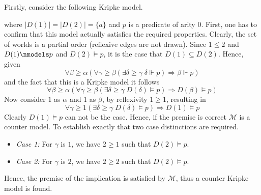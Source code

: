 \documentclass[11pt,a4paper]{article}
\newcommand{\sto}{\Rightarrow}
\begin{document}
Firstly, consider the following Kripke model.
\begin{center}
\end{center}
where $|D(1)|=|D(2)|= \{a\}$ and $p$ is a predicate of arity $0$.
First, one has to confirm that this model actually satisfies the required properties. Clearly, the set of worlds is a partial order (reflexive edges are not drawn).
Since $1 \leqslant 2$ and $D(1) \nmodels p$ and  $D(2) \models p$, it is the case that $D(1) \subseteq D(2)$. Hence, given
\begin{equation*}
\forall \beta \geqslant \alpha ( \forall \gamma \geqslant \beta (\exists \delta \geqslant \gamma \; \delta \Vdash  p ) \sto  \beta \Vdash p ) 
\end{equation*}
and the fact that this is a Kripke model it follows
\begin{equation*}
\forall \beta \geqslant \alpha ( \forall \gamma \geqslant \beta (\exists \delta \geqslant \gamma \; D(\delta) \models  p ) \sto  D(\beta) \models p ) 
\end{equation*}
Now consider $1$ as $\alpha$  and $1$ as $\beta$, by reflexivity $1 \geqslant 1$, resulting in 
\begin{equation*}
 \forall \gamma \geqslant 1 (\exists \delta \geqslant \gamma \; D(\delta) \models  p ) \sto  D(1) \models p 
\end{equation*}
Clearly $ D(1) \models p $ can not be the case. Hence, if the premise is correct $\mathcal{M}$ is a counter model. To establish exactly that two case distinctions are required.
\begin{itemize}
\item \emph{Case 1:} For $\gamma$ is $1$, we have $2 \geqslant 1$ such that $D(2) \models p$.
\item \emph{Case 2:} For $\gamma$ is $2$, we have $2\geqslant 2$ such that $D(2) \models p$.
\end{itemize}
Hence, the premise of the implication is satisfied by $\mathcal{M}$, thus a counter Kripke model is found.
\end{document}
